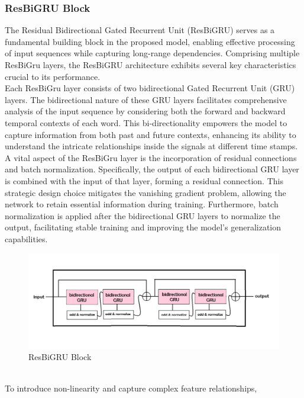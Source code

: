 \documentclass[a4paper, noexaminfo]{sapthesis}
\begin{document}
\subsubsection{ResBiGRU Block}
The Residual Bidirectional Gated Recurrent Unit (ResBiGRU) serves as a 
fundamental building block in the proposed model, enabling effective 
processing of input sequences while capturing long-range dependencies. 
Comprising multiple ResBiGru layers, the ResBiGRU architecture 
exhibits several key characteristics crucial to its performance.\newline \\
Each ResBiGru layer consists of two bidirectional Gated Recurrent 
Unit (GRU) layers. The bidirectional nature of these GRU layers 
facilitates comprehensive analysis of the input sequence by 
considering both the forward and backward temporal contexts 
of each word. This bi-directionality empowers the model to 
capture information from both past and future contexts, enhancing 
its ability to understand the intricate relationships inside the signals 
at different time stamps. \newline \\
A vital aspect of the ResBiGru layer is the incorporation of residual 
connections and batch normalization. Specifically, the output of each 
bidirectional GRU layer is combined with the input of that layer, 
forming a residual connection. This strategic design choice mitigates 
the vanishing gradient problem, allowing the network to retain essential 
information during training. Furthermore, batch normalization is applied 
after the bidirectional GRU layers to normalize the output, facilitating 
stable training and improving the model's generalization capabilities.
\begin{figure}[h!]
  \centering
  \includegraphics[width=1\linewidth]{images/resbigru.png}
  \caption{ResBiGRU Block}
  \end{figure}
  \newline \\
To introduce non-linearity and capture complex feature relationships, 
\end{document}
